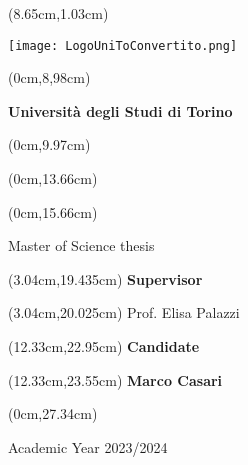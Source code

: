 \documentclass[a4paper,10 pt,titlepage,twoside]{book}
\begin{document}
\frontmatter

\thispagestyle{empty}

\begingroup
\TahomaFont


\begin{textblock*}{4cm}(8.65cm,1.03cm)
	\centerline {\texttt{[image: LogoUniToConvertito.png]}}
\end{textblock*}


\begin{textblock*}{21cm}(0cm,8,98cm)
	\fontsize{18}{22}\selectfont
	\centerline {\textbf{ Universit\`a degli Studi di Torino}}
\end{textblock*}
\begin{textblock*}{21cm}(0cm,9.97cm)
	\fontsize{18}{22}\selectfont
\end{textblock*}


\begin{textblock*}{21cm}(0cm,13.66cm)
	\fontsize{20}{24}\selectfont
\end{textblock*}
\begin{textblock*}{21cm}(0cm,15.66cm)
	\fontsize{18}{22}\selectfont
	\centerline{\Large {Master of Science thesis}}
\end{textblock*}



\fontsize{14}{17}\selectfont

\begin{textblock*}{8cm}(3.04cm,19.435cm)
	\noindent 
	\textbf{Supervisor}
\end{textblock*}
\begin{textblock*}{8cm}(3.04cm,20.025cm)
	\noindent 
	Prof. Elisa Palazzi
\end{textblock*}


\begin{textblock*}{8cm}(12.33cm,22.95cm)
	\noindent
	\textbf{Candidate}
\end{textblock*}
\begin{textblock*}{8cm}(12.33cm,23.55cm)
	\noindent	\textbf{Marco Casari}
\end{textblock*}

\begin{textblock*}{21cm}(0cm,27.34cm)
	\centerline{Academic Year 2023/2024}
\end{textblock*}

\endgroup

\newpage
$ $

\newpage
$ $

\end{document}
